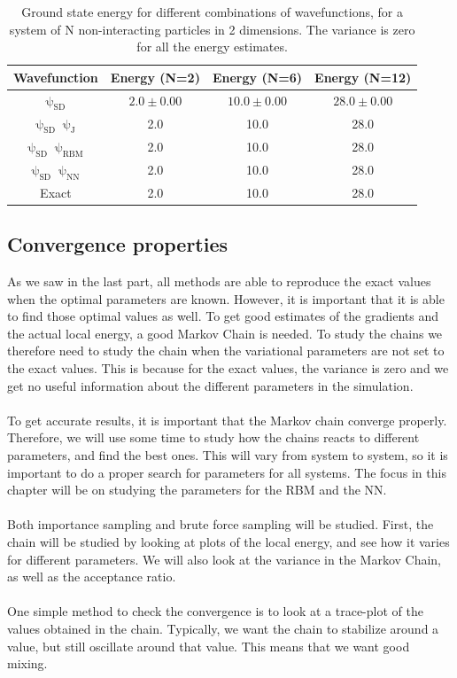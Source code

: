 \begin{table}[]
    \centering
    \begin{tabular}{c|c|c|c} 
        Wavefunction & Energy (N=2) & Energy (N=6) & Energy (N=12) \\ \hline
        $\uppsi_\text{SD}$ &  $2.0\pm 0.00$ & $10.0 \pm 0.00$  & $28.0 \pm 0.00$ \\
        $\uppsi_\text{SD}\uppsi_\text{J}$ & 2.0 & 10.0 & 28.0 \\
        $\uppsi_\text{SD}\uppsi_\text{RBM}$ & 2.0 & 10.0 & 28.0 \\
        $\uppsi_\text{SD}\uppsi_\text{NN}$ & 2.0 & 10.0 & 28.0\\ \hline
        Exact & 2.0 & 10.0 & 28.0 \\
    \end{tabular}
    \caption{Ground state energy for different combinations of wavefunctions, for a system of N non-interacting particles in 2 dimensions. The variance is zero for all the energy estimates.}
    \label{tab:non-interacting 2 particles in 2 dims}
\end{table}

\subsection{Convergence properties}
As we saw in the last part, all methods are able to reproduce the exact values when the optimal parameters are known. However, it is important that it is able to find those optimal values as well. To get good estimates of the gradients and the actual local energy, a good Markov Chain is needed. To study the chains we therefore need to study the chain when the variational parameters are not set to the exact values. This is because for the exact values, the variance is zero and we get no useful information about the different parameters in the simulation. 
\\
\\
To get accurate results, it is important that the Markov chain converge properly. Therefore, we will use some time to study how the chains reacts to different parameters, and find the best ones. This will vary from system to system, so it is important to do a proper search for parameters for all systems. The focus in this chapter will be on studying the parameters for the RBM and the NN. 
\\
\\
Both importance sampling and brute force sampling will be studied. 
First, the chain will be studied by looking at plots of the local energy, and see how it varies for different parameters. We will also look at the variance in the Markov Chain, as well as the acceptance ratio. 
\\
\\
One simple method to check the convergence is to look at a trace-plot of the values obtained in the chain. Typically, we want the chain to stabilize around a value, but still oscillate around that value. This means that we want good mixing.

